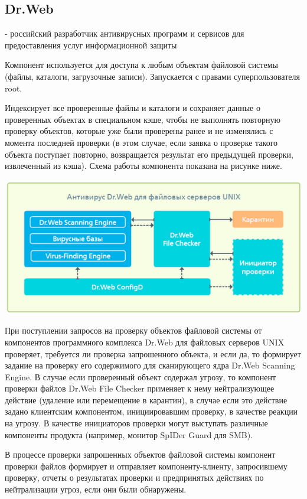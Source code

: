 \documentclass[a4paper,14pt]{extarticle}
\begin{document}
\subsection{Dr.Web}
- российский разработчик антивирусных программ и сервисов для предоставления услуг информационной защиты

Компонент используется для доступа к любым объектам файловой системы (файлы, каталоги, загрузочные записи). Запускается с правами суперпользователя root.

Индексирует все проверенные файлы и каталоги и сохраняет данные о проверенных объектах в специальном кэше, чтобы не выполнять повторную проверку объектов, которые уже были проверены ранее и не изменялись с момента последней проверки (в этом случае, если заявка о проверке такого объекта поступает повторно, возвращается результат его предыдущей проверки, извлеченный из кэша). Схема работы компонента показана на рисунке ниже.

\begin{center}
  \includegraphics[scale=0.9]{img/drweb.png}
\end{center}
При поступлении запросов на проверку объектов файловой системы от компонентов программного комплекса Dr.Web для файловых серверов UNIX проверяет, требуется ли проверка запрошенного объекта, и если да, то формирует задание на проверку его содержимого для сканирующего ядра Dr.Web Scanning Engine. В случае если проверенный объект содержал угрозу, то компонент проверки файлов Dr.Web File Checker применяет к нему нейтрализующее действие (удаление или перемещение в карантин), в случае если это действие задано клиентским компонентом, инициировавшим проверку, в качестве реакции на угрозу. В качестве инициаторов проверки могут выступать различные компоненты продукта (например, монитор SpIDer Guard для SMB).

В процессе проверки запрошенных объектов файловой системы компонент проверки файлов формирует и отправляет компоненту-клиенту, запросившему проверку, отчеты о результатах проверки и предпринятых действиях по нейтрализации угроз, если они были обнаружены.
\end{document}
